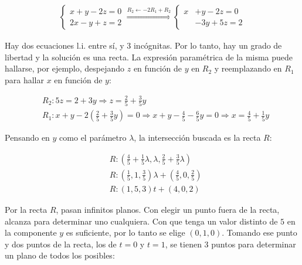 \documentclass{article}
\begin{document}
\begin{enumerate}[a)]
\begin{subequations}
\begin{align}
\left\{
\begin{array}{ll}
x + y -2z = 0 \\
2x -y + z = 2
\end{array}
\right. \overset{R_2 \leftarrow -2R_1 + R_2}{\Longrightarrow}
\left\{
\begin{array}{ll}
x & + y -2z = 0 \\
  & - 3y + 5z = 2
\end{array}
\right.
\end{align}
\end{subequations}

Hay dos ecuaciones l.i. entre sí, y 3 incógnitas. Por lo tanto, hay un grado de libertad y la solución es una recta. La expresión paramétrica de la misma puede hallarse, por ejemplo, despejando $z$ en función de $y$ en $R_2$ y reemplazando en $R_1$ para hallar $x$ en función de $y$:

\begin{subequations}
\begin{align}
& R_2: 5z = 2 + 3y \Rightarrow z = \frac{2}{5} + \frac{3}{5} y \\
& R_1: x + y - 2 \left( \frac{2}{5} + \frac{3}{5} y \right) = 0 \Rightarrow x + y -\frac{4}{5} - \frac{6}{5} y = 0 \Rightarrow x = \frac{4}{5} + \frac{1}{5} y
\end{align}
\end{subequations}

Pensando en $y$ como el parámetro $\lambda$, la intersección buscada es la recta $R$:

\begin{subequations}
\begin{align}
& R: \left( \frac{4}{5} + \frac{1}{5} \lambda, \lambda, \frac{2}{5} + \frac{3}{5} \lambda \right) \\
& R: \left(\frac{1}{5}, 1, \frac{3}{5} \right) \lambda + \left(\frac{4}{5}, 0, \frac{2}{5} \right) \\
& R: (1, 5, 3) t + (4, 0, 2)
\end{align}
\end{subequations}

Por la recta $R$, pasan infinitos planos. Con elegir un punto fuera de la recta, alcanza para determinar uno cualquiera. Con que tenga un valor distinto de $5$ en la componente $y$ es suficiente, por lo tanto se elige $(0, 1, 0)$. Tomando ese punto y dos puntos de la recta, los de $t=0$ y $t=1$, se tienen 3 puntos para determinar un plano de todos los posibles:


\end{enumerate}
\end{document}
